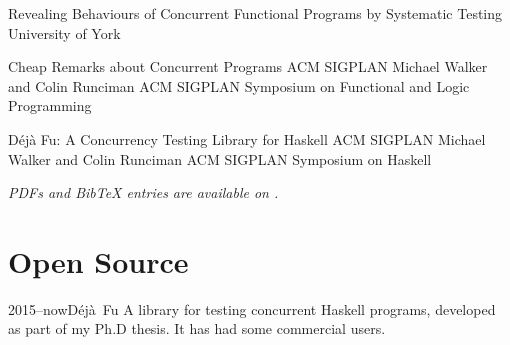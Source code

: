 \documentclass[a4paper]{barrucadu-cv}
\newcommand{\range}[2]{#1–#2}
\newcommand{\orange}[1]{\range{#1}{now}}
\begin{document}
\def\entryheadinglevel{subsection}

  {Revealing Behaviours of Concurrent Functional Programs by Systematic Testing}
  {University of York}

  {Cheap Remarks about Concurrent Programs}
  {ACM SIGPLAN}
  {Michael Walker and Colin Runciman}
  {ACM SIGPLAN Symposium on Functional and Logic Programming}

  {Déjà Fu: A Concurrency Testing Library for Haskell}
  {ACM SIGPLAN}
  {Michael Walker and Colin Runciman}
  {ACM SIGPLAN Symposium on Haskell}

\textit{PDFs and BibTeX entries are available on .}

\section{Open Source}

\begin{cventry}{\orange{2015}}{D\'{e}j\`{a}~Fu}
  A library for testing concurrent Haskell programs,
  developed as part of my Ph.D thesis. It has had some commercial users.

  \textbf{\small{}}
\end{cventry}
\end{document}
